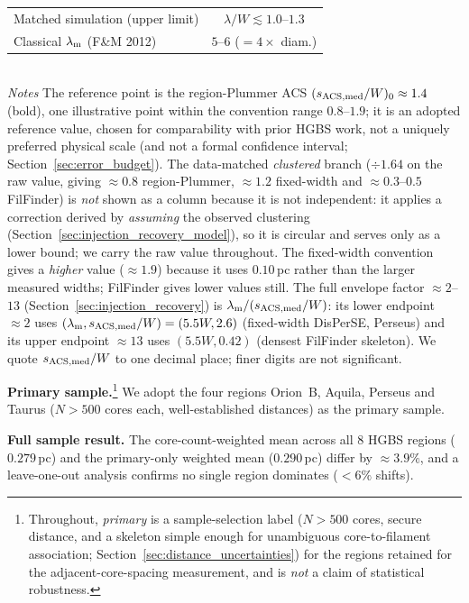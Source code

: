 \documentclass[usenatbib,twoside,twocolumn]{mnras}
\begin{document}
\begin{table}
\begin{tabular}{p{4.6cm}cc}
Matched simulation (upper limit) & \multicolumn{2}{c}{$\lambda/W\lesssim1.0$--$1.3$} \\
Classical $\lambda_{\rm m}$ (F\&M 2012) & \multicolumn{2}{c}{$5$--$6$ ($=4\times$ diam.)} \\
\bottomrule
\end{tabular}
\\[2pt]
\footnotesize
\emph{Notes} The reference point is the region-Plummer ACS $(s_{\rm ACS,med}/W)_0\approx1.4$ (bold), one illustrative point within the convention range $0.8$--$1.9$; it is an adopted reference value, chosen for comparability with prior HGBS work, not a uniquely preferred physical scale (and not a formal confidence interval; Section~\ref{sec:error_budget}). The data-matched \emph{clustered} branch ($\div1.64$ on the raw value, giving $\approx0.8$ region-Plummer, $\approx1.2$ fixed-width and $\approx0.3$--$0.5$ FilFinder) is \emph{not} shown as a column because it is not independent: it applies a correction derived by \emph{assuming} the observed clustering (Section~\ref{sec:injection_recovery_model}), so it is circular and serves only as a lower bound; we carry the raw value throughout. The fixed-width convention gives a \emph{higher} value ($\approx1.9$) because it uses $0.10$\,pc rather than the larger measured widths; FilFinder gives lower values still. The full envelope factor $\approx2$--$13$ (Section~\ref{sec:injection_recovery}) is $\lambda_{\rm m}/(s_{\rm ACS,med}/W)$: its lower endpoint $\approx2$ uses $(\lambda_{\rm m},s_{\rm ACS,med}/W)=(5.5W,2.6)$ (fixed-width DisPerSE, Perseus) and its upper endpoint $\approx13$ uses $(5.5W,0.42)$ (densest FilFinder skeleton). We quote $s_{\rm ACS,med}/W$ to one decimal place; finer digits are not significant.
\end{table}

\textbf{Primary sample.}\footnote{Throughout, \emph{primary} is a sample-selection label ($N>500$ cores, secure distance, and a skeleton simple enough for unambiguous core-to-filament association; Section~\ref{sec:distance_uncertainties}) for the regions retained for the adjacent-core-spacing measurement, and is \emph{not} a claim of statistical robustness.} We adopt the four regions Orion~B, Aquila, Perseus and Taurus ($N>500$ cores each, well-established distances) as the primary sample.

\textbf{Full sample result.} The core-count-weighted mean across all 8 HGBS regions ($0.279$\,pc) and the primary-only weighted mean ($0.290$\,pc) differ by $\approx3.9\%$, and a leave-one-out analysis confirms no single region dominates ($<6\%$ shifts).
\end{document}

